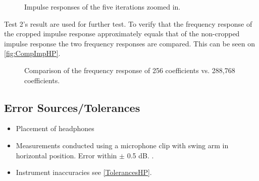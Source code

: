\begin{figure}[H]
	\centering
	
	\caption{Impulse responses of the five iterations zoomed in.}
	\label{fig:ImpRespCropHP}
\end{figure}

Test 2's result are used for further test. To verify that the frequency response of the cropped impulse response approximately equals that of the non-cropped impulse response the two frequency responses are compared. This can be seen on \autoref{fig:CompImpHP}.

\begin{figure}[H]
	\centering
	
	\caption{Comparison of the frequency response of 256 coefficients vs. 288,768 coefficients.}
	\label{fig:CompImpHP}
\end{figure}



\subsection{Error Sources/Tolerances}
\begin{itemize}
	\item Placement of headphones %
	 \item Measurements conducted using a microphone clip with swing arm in horizontal position. Error within $\pm$ 0.5 dB. \citep{BK1985}. 
	\item Instrument inaccuracies see \autoref{TolerancesHP}.
\end{itemize}

